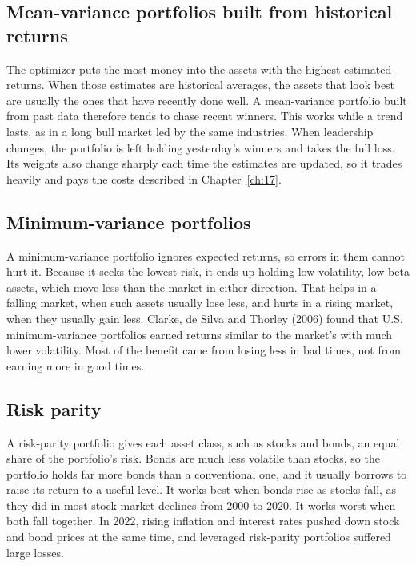 \subsection{Mean-variance portfolios built from historical returns}

The optimizer puts the most money into the assets with the highest estimated returns. When those estimates are historical averages, the assets that look best are usually the ones that have recently done well. A mean-variance portfolio built from past data therefore tends to chase recent winners. This works while a trend lasts, as in a long bull market led by the same industries. When leadership changes, the portfolio is left holding yesterday's winners and takes the full loss. Its weights also change sharply each time the estimates are updated, so it trades heavily and pays the costs described in Chapter~\ref{ch:17}.

\subsection{Minimum-variance portfolios}

A minimum-variance portfolio ignores expected returns, so errors in them cannot hurt it. Because it seeks the lowest risk, it ends up holding low-volatility, low-beta assets, which move less than the market in either direction. That helps in a falling market, when such assets usually lose less, and hurts in a rising market, when they usually gain less. Clarke, de Silva and Thorley (2006) found that U.S. minimum-variance portfolios earned returns similar to the market's with much lower volatility. Most of the benefit came from losing less in bad times, not from earning more in good times.

\subsection{Risk parity}

A risk-parity portfolio gives each asset class, such as stocks and bonds, an equal share of the portfolio's risk. Bonds are much less volatile than stocks, so the portfolio holds far more bonds than a conventional one, and it usually borrows to raise its return to a useful level. It works best when bonds rise as stocks fall, as they did in most stock-market declines from 2000 to 2020. It works worst when both fall together. In 2022, rising inflation and interest rates pushed down stock and bond prices at the same time, and leveraged risk-parity portfolios suffered large losses.


